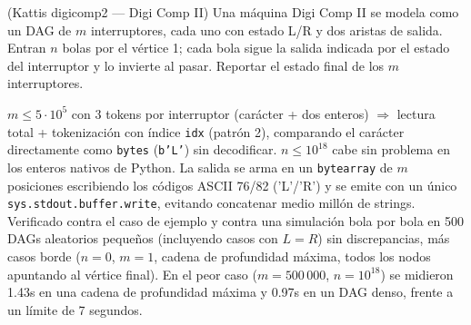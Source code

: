 
(Kattis digicomp2 — Digi Comp II) Una máquina Digi Comp II se modela como un DAG de $m$ interruptores, cada uno con estado L/R y dos aristas de salida. Entran $n$ bolas por el vértice 1; cada bola sigue la salida indicada por el estado del interruptor y lo invierte al pasar. Reportar el estado final de los $m$ interruptores.

 $m \le 5\cdot10^5$ con 3 tokens por interruptor (carácter + dos enteros) $\Rightarrow$ lectura total + tokenización con índice \texttt{idx} (patrón 2), comparando el carácter directamente como \texttt{bytes} (\texttt{b'L'}) sin decodificar. $n \le 10^{18}$ cabe sin problema en los enteros nativos de Python. La salida se arma en un \texttt{bytearray} de $m$ posiciones escribiendo los códigos ASCII 76/82 ('L'/'R') y se emite con un único \texttt{sys.stdout.buffer.write}, evitando concatenar medio millón de strings. Verificado contra el caso de ejemplo y contra una simulación bola por bola en 500 DAGs aleatorios pequeños (incluyendo casos con $L = R$) sin discrepancias, más casos borde ($n=0$, $m=1$, cadena de profundidad máxima, todos los nodos apuntando al vértice final). En el peor caso ($m = 500\,000$, $n = 10^{18}$) se midieron \aprox{}1.43s en una cadena de profundidad máxima y \aprox{}0.97s en un DAG denso, frente a un límite de 7 segundos.


